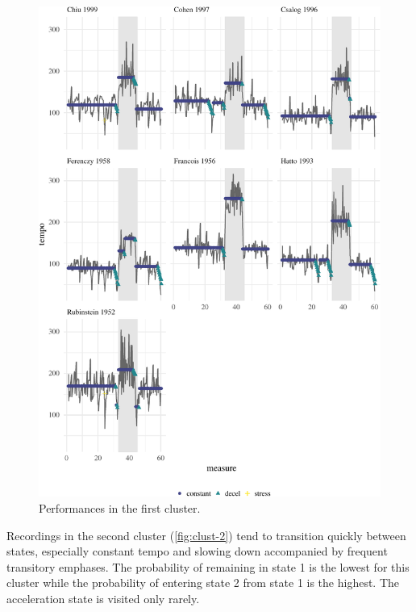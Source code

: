 \documentclass[12pt]{article}
\begin{document}
\begin{figure}

{\centering \includegraphics{gfx/clust-1-1} 

}

\caption{Performances in the first cluster.}\label{fig:clust-1}
\end{figure}

Recordings in the second cluster (\autoref{fig:clust-2}) tend to
transition quickly between states, especially constant tempo and slowing
down accompanied by frequent transitory emphases. The probability of
remaining in state 1 is the lowest for this cluster while the
probability of entering state 2 from state 1 is the highest. The
acceleration state is visited only rarely.
\end{document}
